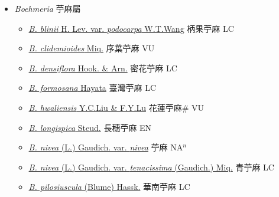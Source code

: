 
  \begin{itemize}
 \item[] \textit{Boehmeria} 苧麻屬
                    
  \begin{itemize}
        \item[] \href{http://www.theplantlist.org/tpl1.1/search?q=Boehmeria+blinii+var.+podocarpa}{\textit{B. blinii} H. Lev. var. \textit{podocarpa} W.T.Wang}   柄果苧麻 LC
        \item[] \href{http://www.theplantlist.org/tpl1.1/search?q=Boehmeria+clidemioides}{\textit{B. clidemioides} Miq.}   序葉苧麻 VU
        \item[] \href{http://www.theplantlist.org/tpl1.1/search?q=Boehmeria+densiflora}{\textit{B. densiflora} Hook. \& Arn.}   密花苧麻 LC
        \item[] \href{http://www.theplantlist.org/tpl1.1/search?q=Boehmeria+formosana}{\textit{B. formosana} Hayata}   臺灣苧麻 LC
        \item[] \href{http://www.theplantlist.org/tpl1.1/search?q=Boehmeria+hwaliensis}{\textit{B. hwaliensis} Y.C.Liu \& F.Y.Lu}   花蓮苧麻\# VU
        \item[] \href{http://www.theplantlist.org/tpl1.1/search?q=Boehmeria+longispica}{\textit{B. longispica} Steud.}   長穗苧麻 EN
        \item[] \href{http://www.theplantlist.org/tpl1.1/search?q=Boehmeria+nivea+var.+nivea}{\textit{B. nivea} (L.) Gaudich. var. \textit{nivea}}   苧麻 NA$^n$
        \item[] \href{http://www.theplantlist.org/tpl1.1/search?q=Boehmeria+nivea+var.+tenacissima}{\textit{B. nivea} (L.) Gaudich. var. \textit{tenacissima} (Gaudich.) Miq.}   青苧麻 LC
        \item[] \href{http://www.theplantlist.org/tpl1.1/search?q=Boehmeria+pilosiuscula}{\textit{B. pilosiuscula} (Blume) Hassk.}   華南苧麻 LC

\end{itemize}
\end{itemize}
